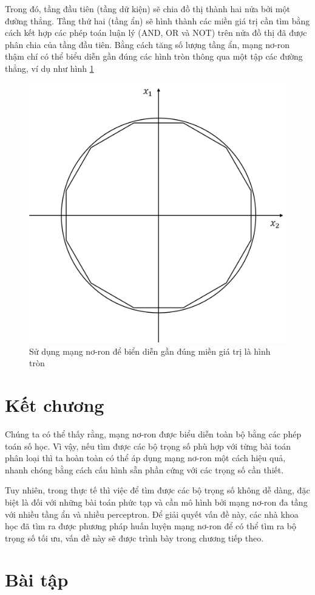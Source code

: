 Trong đó, tầng đầu tiên (tầng dữ kiện) sẽ chia đồ thị thành hai nửa bởi một đường thẳng. Tầng thứ hai (tầng ẩn) sẽ hình thành các miền giá trị cần tìm bằng cách kết hợp các phép toán luận lý (AND, OR và NOT) trên nửa đồ thị đã được phân chia của tầng đầu tiên. Bằng cách tăng số lượng tầng ẩn, mạng nơ-ron thậm chí có thể biểu diễn gần đúng các hình tròn thông qua một tập các đường thẳng, ví dụ như hình \ref{fig:circleNeuron}

\begin{figure}[!h]
	\centering
		\includegraphics[width=0.5\columnwidth]{books/artificial-neural-network/chapter01/figure/Picture5.png}
    	\caption{Sử dụng mạng nơ-ron để biển diễn gần đúng miền giá trị là hình tròn}
	\centering
	\label{fig:circleNeuron}
\end{figure}

\section{Kết chương}
\label{sec:endChp}

Chúng ta có thể thấy rằng, mạng nơ-ron được biểu diễn toàn bộ bằng các phép toán số học. Vì vậy, nếu tìm được các bộ trọng số phù hợp với từng bài toán phân loại thì ta hoàn toàn có thể áp dụng mạng nơ-ron một cách hiệu quả, nhanh chóng bằng cách cấu hình sẵn phần cứng với các trọng số cần thiết.

Tuy nhiên, trong thực tế thì việc để tìm được các bộ trọng số không dễ dàng, đặc biệt là đối với những bài toán phức tạp và cần mô hình bởi mạng nơ-ron đa tầng với nhiều tầng ẩn và nhiều perceptron. Để giải quyết vấn đề này, các nhà khoa học đã tìm ra được phương pháp huấn luyện mạng nơ-ron để có thể tìm ra bộ trọng số tối ưu, vấn đề này sẽ được trình bày trong chương tiếp theo.

\newpage

\section{Bài tập}

